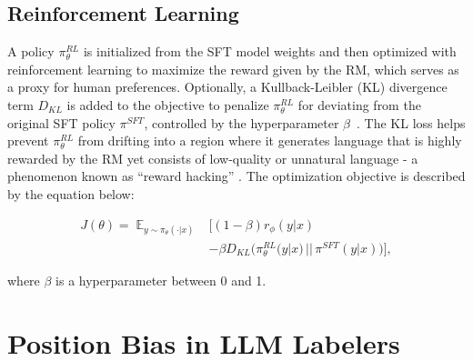 \documentclass[11pt]{article}
\begin{document}
\subsection{Reinforcement Learning}
\label{sec:prelim_rl}
A policy $\pi_{\theta}^{RL}$ is initialized from the SFT model weights and then optimized with reinforcement learning to maximize the reward given by the RM, which serves as a proxy for human preferences. Optionally, a Kullback-Leibler (KL) divergence term $D_{KL}$ is added to the objective to penalize $\pi_{\theta}^{RL}$ for deviating from the original SFT policy $\pi^{SFT}$, controlled by the hyperparameter $\beta$~\citep{fox2015taming, geist2019theory}. The KL loss helps prevent $\pi_{\theta}^{RL}$ from drifting into a region where it generates language that is highly rewarded by the RM yet consists of low-quality or unnatural language - a phenomenon known as ``reward hacking'' \citep{everitt2016avoiding,amodei2016concrete}. The optimization objective is described by the equation below:

\begin{small}
\begin{align*}
    J(\theta) = \mathop{ \mathbb{E}}_{y \sim \pi_\theta(\cdot | x)}
         &\Big[ (1 - \beta) r_\phi(y | x) \\
        &- \beta 
            D_{KL} \big(\pi^{RL}_\theta(y|x) \, || \, \pi^{SFT} (y|x)\big) \Big],
\end{align*}
\end{small}

\noindent where $\beta$ is a hyperparameter between 0 and 1.


\section{Position Bias in LLM Labelers}
\label{sec:analysis_position_bias}

\begin{table}[ht]
\centering
\setlength{\tabcolsep}{1pt}
\caption{Position bias is more prevalent in smaller model sizes, measured by the percentage of examples where the LLM prefers the same position even after swapping the order of candidates (\textit{``\% Same Position Preferred''}). Analysis is conducted using the ``\textit{Detailed + CoT 0-shot}'' prompt for the summarization task.}

\label{tab:position_bias}
\end{table}
\end{document}
